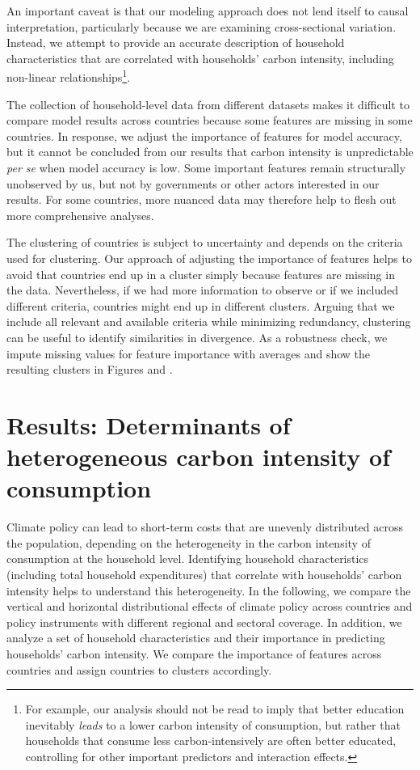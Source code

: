 \documentclass[12pt, a4paper]{article}
\begin{document}
An important caveat is that our modeling approach does not lend itself to causal interpretation, particularly  because we are examining cross-sectional variation. Instead, we attempt to provide an accurate description of household characteristics that are correlated with households' carbon intensity, including non-linear relationships\footnote{For example, our analysis should not be read to imply that better education inevitably \textit{leads} to a lower carbon intensity of consumption, but rather that households that consume less carbon-intensively are often better educated, controlling for other important predictors and interaction effects.}.

The collection of household-level data from different datasets makes it difficult to compare model results across countries because some features are missing in some countries. In response, we adjust the importance of features for model accuracy, but it cannot be concluded from our results that carbon intensity is unpredictable \textit{per se} when model accuracy is low. Some important features remain structurally unobserved by us, but not by governments or other actors interested in our results. For some countries, more nuanced data may therefore help to flesh out more comprehensive analyses.

The clustering of countries is subject to uncertainty and depends on the criteria used for clustering. Our approach of adjusting the importance of features helps to avoid that countries end up in a cluster simply because features are missing in the data. Nevertheless, if we had more information to observe or if we included different criteria, countries might end up in different clusters. Arguing that we include all relevant and available criteria while minimizing redundancy, clustering can be useful to identify similarities in divergence. As a robustness check, we impute missing values for feature importance with averages and show the resulting clusters in Figures  and .

\section{Results: Determinants of heterogeneous carbon intensity of consumption} \label{sec:results}

Climate policy can lead to short-term costs that are unevenly distributed across the population, depending on the heterogeneity in the carbon intensity of consumption at the household level. Identifying household characteristics (including total household expenditures) that correlate with households' carbon intensity helps to understand this heterogeneity. In the following, we compare the vertical and horizontal distributional effects of climate policy across countries and policy instruments with different regional and sectoral coverage. In addition, we analyze a set of household characteristics and their importance in predicting households' carbon intensity. We compare the importance of features across countries and assign countries to clusters accordingly.
\end{document}
